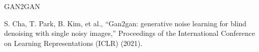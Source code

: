 GAN2GAN

S. Cha, T. Park, B. Kim, et al., “Gan2gan: generative noise learning for blind denoising with single noisy images,” Proceedings of the International Conference on Learning Representations (ICLR) (2021).

